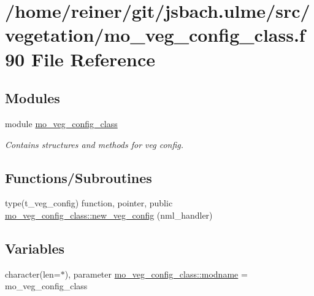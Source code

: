 \hypertarget{mo__veg__config__class_8f90}{}\section{/home/reiner/git/jsbach.ulme/src/vegetation/mo\+\_\+veg\+\_\+config\+\_\+class.f90 File Reference}
\label{mo__veg__config__class_8f90}
\subsection*{Modules}
\begin{DoxyCompactItemize}
\item 
module \hyperlink{namespacemo__veg__config__class}{mo\+\_\+veg\+\_\+config\+\_\+class}
\begin{DoxyCompactList}\small\item\em Contains structures and methods for veg config. \end{DoxyCompactList}\end{DoxyCompactItemize}
\subsection*{Functions/\+Subroutines}
\begin{DoxyCompactItemize}
\item 
type(t\+\_\+veg\+\_\+config) function, pointer, public \hyperlink{namespacemo__veg__config__class_ad45bc88a338969c3c20ca8780a84747e}{mo\+\_\+veg\+\_\+config\+\_\+class\+::new\+\_\+veg\+\_\+config} (nml\+\_\+handler)
\end{DoxyCompactItemize}
\subsection*{Variables}
\begin{DoxyCompactItemize}
\item 
character(len=$\ast$), parameter \hyperlink{namespacemo__veg__config__class_afd31198fa2009910db770d611d528ee5}{mo\+\_\+veg\+\_\+config\+\_\+class\+::modname} = \textquotesingle{}mo\+\_\+veg\+\_\+config\+\_\+class\textquotesingle{}
\end{DoxyCompactItemize}
